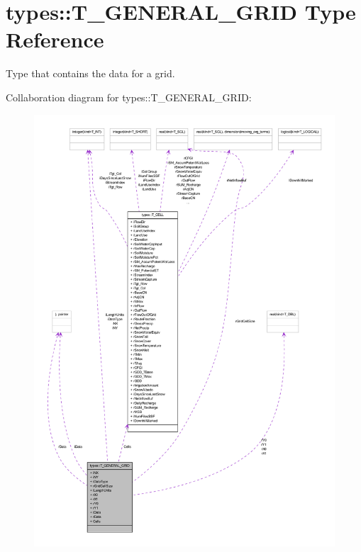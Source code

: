 \hypertarget{typetypes_1_1_t___g_e_n_e_r_a_l___g_r_i_d}{
\section{types::T\_\-GENERAL\_\-GRID Type Reference}
\label{typetypes_1_1_t___g_e_n_e_r_a_l___g_r_i_d}
}


Type that contains the data for a grid.  




Collaboration diagram for types::T\_\-GENERAL\_\-GRID:\nopagebreak
\begin{figure}[H]
\begin{center}
\leavevmode
\includegraphics[width=400pt]{typetypes_1_1_t___g_e_n_e_r_a_l___g_r_i_d__coll__graph}
\end{center}
\end{figure}
